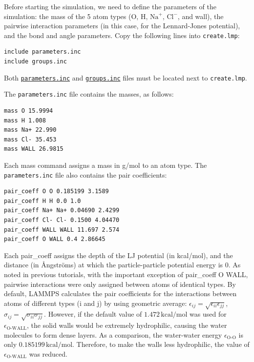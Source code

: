 \documentclass[9pt,tutorial]{livecoms}
\newcommand{\lmpcmd}[1]{\colorbox{listing}{\textcolor{command}{\small{#1}}}} %
\newcommand{\flecmd}[1]{\textcolor{command}{\texttt{#1}}} %
\newcommand{\dwlcmd}[1]{\textcolor{download}{\texttt{#1}}} %
\newcommand{\filepath}{https://raw.githubusercontent.com/lammpstutorials/lammpstutorials-article/main/files/}
\begin{document}
Before starting the simulation, we need to define the parameters of the
simulation: the mass of the 5 atom types (O, H, $\text{Na}^+$, $\text{Cl}^-$,
and wall), the pairwise interaction parameters (in this case, for the
Lennard-Jones potential), and the bond and angle parameters.  Copy the following
lines into \flecmd{create.lmp}:
\begin{lstlisting}
include parameters.inc
include groups.inc
\end{lstlisting}
Both \href{\filepath tutorial4/parameters.inc}{\dwlcmd{parameters.inc}}
and \href{\filepath tutorial4/groups.inc}{\dwlcmd{groups.inc}} files
must be located next to \flecmd{create.lmp}.

The \flecmd{parameters.inc} file contains the masses, as follows:
\begin{lstlisting}
mass O 15.9994
mass H 1.008
mass Na+ 22.990
mass Cl- 35.453
mass WALL 26.9815
\end{lstlisting}
Each \lmpcmd{mass} command assigns a mass in g/mol to an atom type.
The \flecmd{parameters.inc} file also contains the pair coefficients:
\begin{lstlisting}
pair_coeff O O 0.185199 3.1589
pair_coeff H H 0.0 1.0
pair_coeff Na+ Na+ 0.04690 2.4299
pair_coeff Cl- Cl- 0.1500 4.04470
pair_coeff WALL WALL 11.697 2.574
pair_coeff O WALL 0.4 2.86645
\end{lstlisting}
Each \lmpcmd{pair\_coeff} assigns the depth of the LJ potential (in
kcal/mol), and the distance (in Ångströms) at which the
particle-particle potential energy is 0.  As noted in previous
tutorials, with the important exception of \lmpcmd{pair\_coeff O WALL},
pairwise interactions were only assigned between atoms of identical
types.  By default, LAMMPS calculates the pair coefficients for the
interactions between atoms of different types (i and j) by using
geometric average: $\epsilon_{ij} = \sqrt{\epsilon_{ii} \epsilon_{jj}}$,
$\sigma_{ij} = \sqrt{\sigma_{ii} \sigma_{jj}}$.  However, if the default
value of $1.472\,\text{kcal/mol}$ was used for $\epsilon_\text{O-WALL}$,
the solid walls would be extremely hydrophilic, causing the water
molecules to form dense layers.  As a comparison, the water-water energy
$\epsilon_\text{O-O}$ is only $0.185199\,\text{kcal/mol}$.  Therefore,
to make the walls less hydrophilic, the value of
$\epsilon_\text{O-WALL}$ was reduced.
\end{document}
